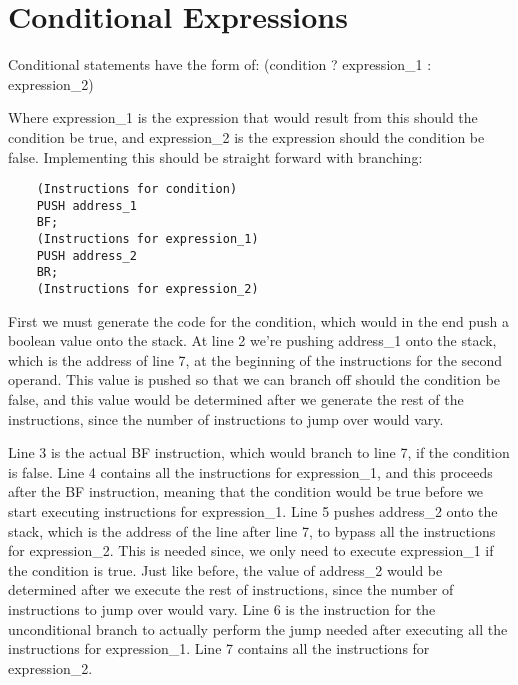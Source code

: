 \documentclass{article}
\begin{document}
\section{Conditional Expressions}

Conditional statements have the form of: (condition ? expression\_1 : expression\_2)

Where expression\_1 is the expression that would result from this should the condition be true, and expression\_2 is the expression should the condition be false. Implementing this should be straight forward with branching:

\begin{lstlisting}
    (Instructions for condition)
    PUSH address_1
    BF;
    (Instructions for expression_1)
    PUSH address_2
    BR;
    (Instructions for expression_2)
\end{lstlisting}

First we must generate the code for the condition, which would in the end push a boolean value onto the stack. At line 2 we're pushing address\_1 onto the stack, which is the address of line 7, at the beginning of the instructions for the second operand. This value is pushed so that we can branch off should the condition be false, and this value would be determined after we generate the rest of the instructions, since the number of instructions to jump over would vary.

Line 3 is the actual BF instruction, which would branch to line 7, if the condition is false. Line 4 contains all the instructions for expression\_1, and this proceeds after the BF instruction, meaning that the condition would be true before we start executing instructions for expression\_1. Line 5 pushes address\_2 onto the stack, which is the address of the line after line 7, to bypass all the instructions for expression\_2. This is needed since, we only need to execute expression\_1 if the condition is true. Just like before, the value of address\_2 would be determined after we execute the rest of instructions, since the number of instructions to jump over would vary. Line 6 is the instruction for the unconditional branch to actually perform the jump needed after executing all the instructions for expression\_1. Line 7 contains all the instructions for expression\_2.
\end{document}
